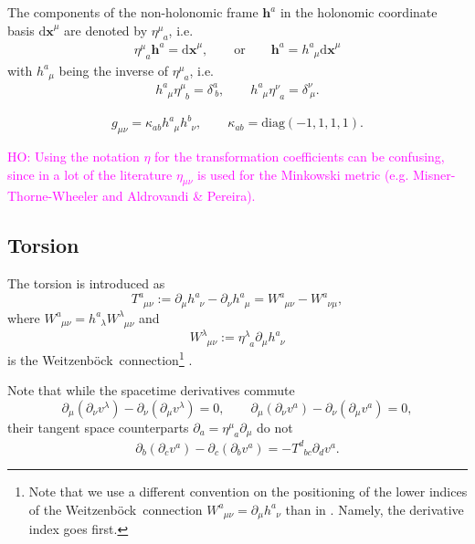 \documentclass[
10pt, %
a4paper, %
oneside, %
headinclude,footinclude, %
BCOR5mm, %
]{scrartcl}
\newcommand{\pd}[1]{\partial_{#1}}
\newcommand{\mg}[1]{\kappa_{#1}}			%
\newcommand{\dx}[1]{{\bm{\mathrm{d}x}^{#1}}}
\newcommand{\bas}[1]{\bm{h}^{#1}}
\newcommand{\tetrsymbol}{h}
\newcommand{\itetrsymbol}{\eta}
\newcommand{\itetr}[2]{\itetrsymbol^{#1}_{\phantom{#1}#2}}
\newcommand{\tetr}[2]{\tetrsymbol^{#1}_{\phantom{#1}#2}}
\newcommand{\D}[1]{\partial_{#1}} %
\newcommand{\Tors}[2]{T^{#1}_{\phantom{a}#2}}
\newcommand{\w}[2]{W^{#1}_{\phantom{#1}#2}}
\newcommand{\We}{Weitzenb\"ock}
\newcommand{\ho}[1]{\textcolor{magenta}{HO: #1}}
\begin{document}
The components of the non-holonomic frame $ \bas{a} $ in the holonomic coordinate basis $ \dx{\mu} 
$ are denoted by $ \itetr{\mu}{a} $, i.e. 
\begin{equation}
	\itetr{\mu}{a} \bas{a} = \dx{\mu}, \qquad \text{or} \qquad \bas{a} = \tetr{a}{\mu}\dx{\mu}
\end{equation}
with $ \tetr{a}{\mu} $ being the inverse of $ \itetr{\mu}{a} $, i.e.
\begin{equation}\label{eqn.inv.tetr}
	\tetr{a}{\mu} \itetr{\mu}{b} = \delta^a_{\ b},
	\qquad
	\tetr{a}{\mu} \itetr{\nu}{a} = \delta^\nu_{\ \mu}.
\end{equation}


\begin{equation}
	g_{\mu\nu} = \mg{ab} \tetr{a}{\mu}\tetr{b}{\nu}, \qquad \mg{ab} = \text{diag}(-1,1,1,1).
\end{equation}

\ho{Using the notation $\eta$ for the transformation coefficients can be
confusing, since in a lot of the literature $\eta_{\mu\nu}$ is used
for the Minkowski metric (e.g. Misner-Thorne-Wheeler and Aldrovandi \& Pereira).}





\subsection{Torsion}

The torsion is introduced as
\begin{equation}\label{eqn.def.tors}
\Tors{a}{\mu\nu}:=\D{\mu}\tetr{a}{\nu} - \D{\nu}\tetr{a}{\mu} = 
\w{a}{\mu\nu} - \w{a}{\nu\mu},
\end{equation}
where $ \w{a}{\mu\nu} = \tetr{a}{\lambda}\w{\lambda}{\mu\nu}$ and 
\begin{equation}
\w{\lambda}{\mu\nu} := 
\itetr{\lambda}{a}\pd{\mu} \tetr{a}{\nu}
\end{equation}
is the \We\ connection\footnote{Note that we use a different convention on the positioning of the 
lower indices of the \We\ connection $ \w{a}{\mu\nu} = \pd{\mu}\tetr{a}{\nu} $ than in 
\cite{AldrovandiPereiraBook}. Namely, the derivative index goes first.}
\cite{AldrovandiPereiraBook,KleinertMultivalued}.


Note that while the spacetime derivatives commute
\begin{equation}\label{eqn.commut.D}
\D{\mu}(\D{\nu} v^\lambda) - \D{\nu}(\D{\mu} v^\lambda) = 0, 
\qquad 
\D{\mu}(\D{\nu} v^a) - \D{\nu}(\D{\mu} v^a) = 0,
\end{equation}
their tangent space counterparts $\D{a} = \itetr{\mu}{a}\D{\mu}$ do not
\begin{equation}
\D{b}(\D{c} v^a) - \D{c}(\D{b} v^a) = 
-\Tors{d}{b c}\D{d}v^a .
\end{equation}
\end{document}
